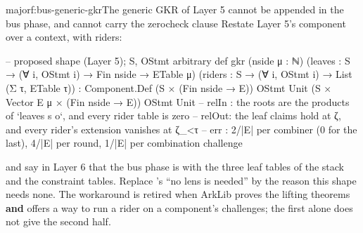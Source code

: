 \begin{finding}{major}{f:bus-generic-gkr}{The generic GKR of Layer 5 cannot be appended in the bus phase, and cannot carry the zerocheck clause}
 Restate Layer 5's component over a context, with riders:
\begin{leancode}
-- proposed shape (Layer 5); S, OStmt arbitrary
def gkr (nside μ : ℕ) (leaves : S → (∀ i, OStmt i) → Fin nside → ETable μ)
    (riders : S → (∀ i, OStmt i) → List (Σ τ, ETable τ)) :
    Component.Def (S × (Fin nside → E)) OStmt Unit
                  (S × Vector E μ × (Fin nside → E)) OStmt Unit
-- relIn : the roots are the products of `leaves s o`, and every rider table is zero
-- relOut: the leaf claims hold at ζ, and every rider's extension vanishes at ζ_{<τ}
-- err   : 2/|E| per combiner (0 for the last), 4/|E| per round, 1/|E| per combination challenge
\end{leancode}
and say in Layer 6 that the bus phase is
 with  the three leaf tables of
the stack and  the constraint tables. Replace 's ``no lens is needed'' by
the reason this shape needs none. The workaround is retired when ArkLib proves the lifting
theorems \textbf{and} offers a way to run a rider on a component's challenges; the first alone
does not give the second half.
\end{finding}

